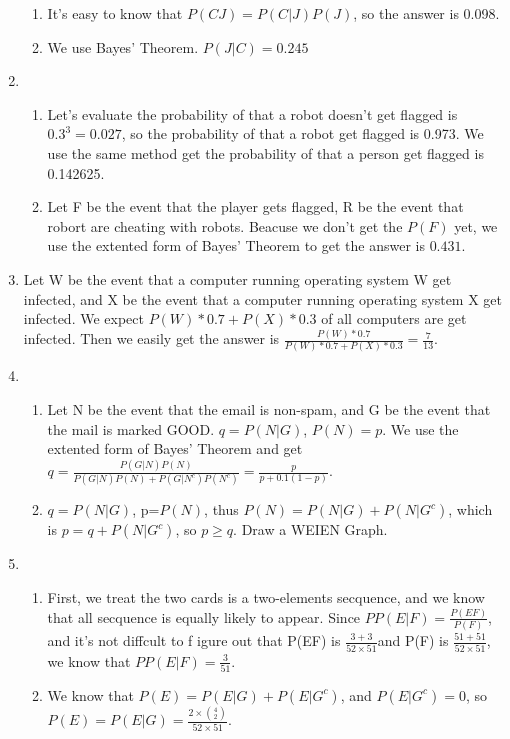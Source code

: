 \documentclass{article}
\begin{document}
\begin{enumerate}
	
	\begin{enumerate}
	\item It's easy to know that $P(CJ)=P(C|J)P(J)$, so the answer is 0.098.
	\item We use Bayes' Theorem. $P(J|C)=0.245$
	\end{enumerate}
	\item \begin{enumerate}
	\item Let's evaluate the probability of that a robot doesn't get flagged is $0.3^3=0.027$, so the probability of that a robot get flagged is 0.973. We use the same method get the probability of that a person get flagged is 0.142625.
	\item Let F be the event that the player gets flagged, R be the event that robort are cheating with robots. Beacuse we don't get the $P(F)$ yet, we use the extented form of Bayes' Theorem to get the answer is $0.431$.
	\end{enumerate}
	\item Let W be the event that a computer running operating system
W get infected, and X be the event that a computer running operating system
X get infected. We expect $P(W)*0.7+P(X)*0.3$ of all computers are get infected. Then we easily get the answer is $\frac{P(W)*0.7}{P(W)*0.7+P(X)*0.3}=\frac{7}{13}$.
	\item \begin{enumerate}
	\item Let N be the event that the email is non-spam, and G be the event that the mail is marked GOOD. $q=P(N|G)$, $P(N)=p$. We use the extented form of Bayes' Theorem and get $q=\frac{ P(G|N)P(N) }{P(G|N)P(N)+P(G|N^c)P(N^c)} =\frac{p}{p+0.1(1-p)}$. 
	\item $q=P(N|G)$, p=$P(N)$, thus $P(N)=P(N|G)+P(N|G^c)$, which is $p=q+P(N|G^c)$, so $p\geq q$. Draw a WEIEN Graph.
	\end{enumerate}
	\item \begin{enumerate}
	\item First, we treat the two cards is a two-elements secquence, and we know that all secquence is equally likely to appear. Since $PP(E|F)=\frac{P(EF)}{P(F)}$, and it's not diffcult to f	igure out that P(EF) is $\frac{3+3}{52\times51}$and P(F) is $\frac{51+51}{52\times51}$, we know that $PP(E|F)=\frac{3}{51}$.
	\item We know that $P(E)=P(E|G)+P(E|G^c)$, and $P(E|G^c)=0$, so $P(E)=P(E|G)=\frac{2\times{4 \choose 2}}{52\times51}$.
	\end{enumerate}

\end{enumerate}
\end{document}

